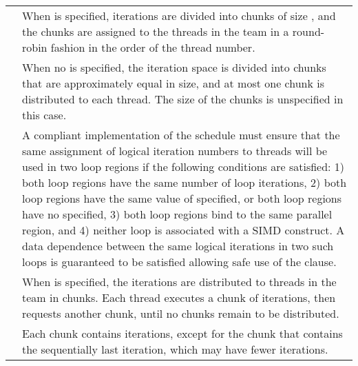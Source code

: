\nolinenumbers
\vspace{1ex}\renewcommand{\arraystretch}{1.5}
\tablefirsthead{%
\hline\\[-3ex]
}
\tablelasttail{\hline}
\begin{supertabular}{ p{0.8in} p{4.3in} }
{} & When {\scode{)}} is specified, iterations are divided
into chunks of size {}, and the chunks are assigned to the threads in
the team in a round-robin fashion in the order of the thread number.\\

 & When no {} is specified, the iteration space is divided into chunks that
are approximately equal in size, and at most one chunk is distributed to each
thread. The size of the chunks is unspecified in this case.\\

 & A compliant implementation of the {} schedule must ensure that the
same assignment of logical iteration numbers to threads will be used in two
loop regions if the following conditions are satisfied: 1) both loop regions have
the same number of loop iterations, 2) both loop regions have the same value
of {} specified, or both loop regions have no {} specified, 3)
both loop regions bind to the same parallel region, and 4) neither loop is
associated with a SIMD construct. A data dependence between the same
logical iterations in two such loops is guaranteed to be satisfied allowing safe
use of the {} clause.\\

{} & When {\scode{)}} is specified, the iterations are
distributed to threads in the team in chunks. Each
thread executes a chunk of iterations, then requests another chunk, until no
chunks remain to be distributed. \\

 & Each chunk contains {} iterations, except for the
chunk that contains the sequentially last iteration, which may have fewer iterations.\\


\end{supertabular}
